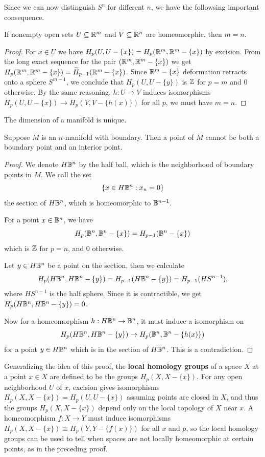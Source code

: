 Since we can now distinguish $S^n$ for different $n$, we have the followsing important consequence.
\begin{corollary}
If nonempty open sets $U\subseteq\mathbb{R}^m$ and $V\subseteq\mathbb{R}^n$ are homeomorphic,
then $m=n$.
\end{corollary}
\begin{proof}
For $x\in U$ we have $H_p(U,U-\{x\})=H_p(\mathbb{R}^m,\mathbb{R}^m-\{x\})$ by excision. From the long exact sequence for the pair $(\mathbb{R}^m,\mathbb{R}^m-\{x\})$ we get $H_p(\mathbb{R}^m,\mathbb{R}^m-\{x\})=\widetilde{H}_{p-1}(\mathbb{R}^m-\{x\})$. Since $\mathbb{R}^m-\{x\}$ deformation retracts onto a sphere $S^{m-1}$, we conclude that $H_p(U,U-\{y\})$ is $\mathbb{Z}$ for $p=m$ and $0$ otherwise. By the same reasoning,
$h:U\to V$ induces isomorphisms $H_p(U,U-\{x\})\to H_p(V,V-\{h(x)\})$ for all $p$, we must have $m=n$.
\end{proof}
\begin{corollary}
The dimension of a manifold is unique.
\end{corollary}
\begin{corollary}
Suppose $M$ is an $n$-manifold with boundary. Then a point of $M$ cannot be both a boundary point and an interior point.
\end{corollary}
\begin{proof}
We denote $H\mathbb{B}^n$ by the half ball, which is the neighborhood of boundary points in $M$. We call the set
\[\{x\in H\mathbb{B}^n: x_{n}=0\}\]
the section of $H\mathbb{B}^n$, which is homeomorphic to $\mathbb{B}^{n-1}$.\par 
For a point $x\in\mathbb{B}^n$, we have
\[H_p(\mathbb{B}^n,\mathbb{B}^n-\{x\})=H_{p-1}(\mathbb{B}^n-\{x\})\]
which is $\mathbb{Z}$ for $p=n$, and $0$ otherwise.\par
Let $y\in H\mathbb{B}^n$ be a point on the section, then we calculate
\[H_p(H\mathbb{B}^n,H\mathbb{B}^n-\{y\})=H_{p-1}(H\mathbb{B}^n-\{y\})=H_{p-1}(HS^{n-1}),\]
where $HS^{n-1}$ is the half sphere. Since it is contractible, we get $H_p(H\mathbb{B}^n,H\mathbb{B}^n-\{y\})=0$.\par
Now for a homeomorphism $h:H\mathbb{B}^n\to\mathbb{B}^n$, it must induce a isomorphism on \[H_p(H\mathbb{B}^n,H\mathbb{B}^n-\{y\})\to H_p(\mathbb{B}^n,\mathbb{B}^n-\{h(x)\})\]
for a point $y\in H\mathbb{B}^n$ which is in the section of $H\mathbb{B}^n$. This is a contradiction.
\end{proof}
Generalizing the idea of this proof, the \textbf{local homology groups} of a space $X$ at a point $x\in X$ are defined to be the groups $H_p(X,X-\{x\})$. For any open neighborhood $U$ of $x$, excision gives isomorphisms $H_p(X,X-\{x\})=H_p(U,U-\{x\})$ assuming points are closed in $X$, and thus the groups $H_p(X,X-\{x\})$ depend only on the local topology of $X$ near $x$. A homeomorphism $f:X\to Y$ must induce isomorphisms $H_p(X,X-\{x\})\cong H_p(Y,Y-\{f(x)\})$ for all $x$ and $p$, so the local homology groups can be used to tell when spaces are not locally homeomorphic at certain points, as in the preceding proof.

